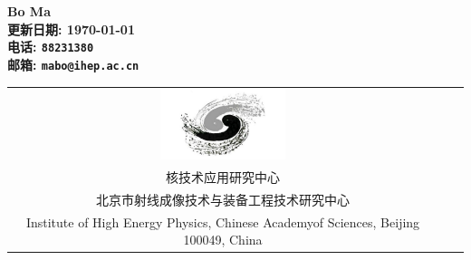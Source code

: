 \documentclass{qbook}
\begin{document}
\pagestyle{empty}
\begin{center}
	\Large{\sffamily\bfseries\heiti Bo Ma} \\ \vspace{2em}
	\Large{\sffamily\bfseries\heiti 更新日期: \today} \\ \vspace{1em}
	\Large{\sffamily\bfseries\heiti 电话: \texttt{88231380}} \\
	\Large{\sffamily\bfseries\heiti 邮箱: \texttt{mabo@ihep.ac.cn}} \\
	
\end{center} 
\vfill
\vspace{30em}
\begin{tabular*}{\textwidth}{ccc}
	\includegraphics[width=0.3\textwidth]{figure/IHEP-LOGO.pdf}
	& \begin{minipage}[b]{0.6\textwidth}
		\small\sffamily
		中国科学院高能物理研究所\\
		 核技术应用研究中心\\
		北京市射线成像技术与装备工程技术研究中心\\
		Institute of High Energy Physics, 
		Chinese Academyof Sciences, Beijing 100049, China  
	\end{minipage}
\end{tabular*}  
\thispagestyle{empty}
\frontmatter  %
\pagestyle{empty}

\pagestyle{empty}
\tableofcontents
\cleardoublepage
 
\mainmatter	  %
\pagestyle{fancy}
\setcounter{page}{0}





\backmatter	
\printbibliography[heading=bibintoc]
\makeatletter
\makeatother
\end{document}
